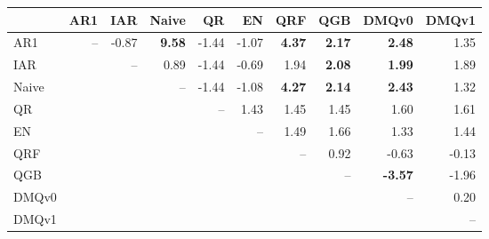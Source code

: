 \begin{tabular}{lrrrrrrrrr}
\toprule
 & AR1 & IAR & Naive & QR & EN & QRF & QGB & DMQv0 & DMQv1 \\
\midrule
AR1 & -- & -0.87 & \textbf{9.58} & -1.44 & -1.07 & \textbf{4.37} & \textbf{2.17} & \textbf{2.48} & 1.35 \\
IAR &  & -- & 0.89 & -1.44 & -0.69 & 1.94 & \textbf{2.08} & \textbf{1.99} & 1.89 \\
Naive &  &  & -- & -1.44 & -1.08 & \textbf{4.27} & \textbf{2.14} & \textbf{2.43} & 1.32 \\
QR &  &  &  & -- & 1.43 & 1.45 & 1.45 & 1.60 & 1.61 \\
EN &  &  &  &  & -- & 1.49 & 1.66 & 1.33 & 1.44 \\
QRF &  &  &  &  &  & -- & 0.92 & -0.63 & -0.13 \\
QGB &  &  &  &  &  &  & -- & \textbf{-3.57} & -1.96 \\
DMQv0 &  &  &  &  &  &  &  & -- & 0.20 \\
DMQv1 &  &  &  &  &  &  &  &  & -- \\
\bottomrule
\end{tabular}
